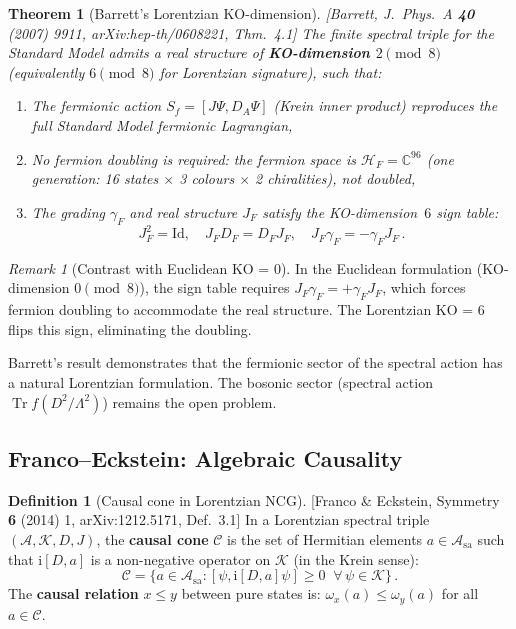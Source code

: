 \documentclass[12pt,a4paper]{article}
\newtheorem{theorem}[proposition]{Theorem}
\theoremstyle{definition}
\newtheorem{definition}[proposition]{Definition}
\theoremstyle{remark}
\newtheorem{remark}[proposition]{Remark}
\newcommand{\Tr}{\operatorname{Tr}}
\newcommand{\ii}{\mathrm{i}}
\newcommand{\Id}{\mathrm{Id}}
\newcommand{\fromlit}[1]{\textcolor{blue!70!black}{\textsf{[#1]}}}
\begin{document}
\begin{theorem}[Barrett's Lorentzian KO-dimension]
\label{thm:barrett-ko}
\fromlit{Barrett, J.\ Phys.\ A \textbf{40} (2007) 9911,
arXiv:hep-th/0608221, Thm.~4.1}
The finite spectral triple for the Standard Model admits a real
structure of \textbf{KO-dimension $2 \pmod{8}$} (equivalently
$6 \pmod{8}$ for Lorentzian signature), such that:
\begin{enumerate}[nosep,label=(\roman*)]
  \item The fermionic action
    $S_f = [J\Psi, D_A\Psi]$ (Krein inner product) reproduces the
    full Standard Model fermionic Lagrangian,
  \item No fermion doubling is required: the fermion space is
    $\mathcal{H}_F = \mathbb{C}^{96}$ (one generation: 16 states
    $\times$ 3 colours $\times$ 2 chiralities), not doubled,
  \item The grading $\gamma_F$ and real structure $J_F$ satisfy the
    KO-dimension~$6$ sign table:
    \begin{equation}
      J_F^2 = \Id, \quad J_F D_F = D_F J_F, \quad
      J_F \gamma_F = -\gamma_F J_F\,.
    \end{equation}
\end{enumerate}
\end{theorem}

\begin{remark}[Contrast with Euclidean KO = 0]
In the Euclidean formulation (KO-dimension $0 \pmod{8}$), the sign
table requires $J_F \gamma_F = +\gamma_F J_F$, which forces fermion
doubling to accommodate the real structure.  The Lorentzian KO = 6
flips this sign, eliminating the doubling.

Barrett's result demonstrates that the fermionic sector of the spectral
action has a natural Lorentzian formulation.  The bosonic sector
(spectral action $\Tr f(D^2/\Lambda^2)$) remains the open problem.
\end{remark}


\subsection{Franco--Eckstein: Algebraic Causality}

\begin{definition}[Causal cone in Lorentzian NCG]
\label{def:causal-cone}
\fromlit{Franco \& Eckstein, Symmetry \textbf{6} (2014) 1,
arXiv:1212.5171, Def.~3.1}
In a Lorentzian spectral triple $(\mathcal{A}, \mathcal{K}, D, J)$,
the \textbf{causal cone} $\mathcal{C}$ is the set of Hermitian elements
$a \in \mathcal{A}_{\mathrm{sa}}$ such that $\ii[D, a]$ is a
non-negative operator on $\mathcal{K}$ (in the Krein sense):
\begin{equation}
  \mathcal{C} = \{a \in \mathcal{A}_{\mathrm{sa}} :
  [\psi, \ii[D,a]\psi] \geq 0 \;\;\forall\,\psi \in \mathcal{K}\}\,.
\end{equation}
The \textbf{causal relation} $x \leq y$ between pure states is:
$\omega_x(a) \leq \omega_y(a)$ for all $a \in \mathcal{C}$.
\end{definition}
\end{document}
